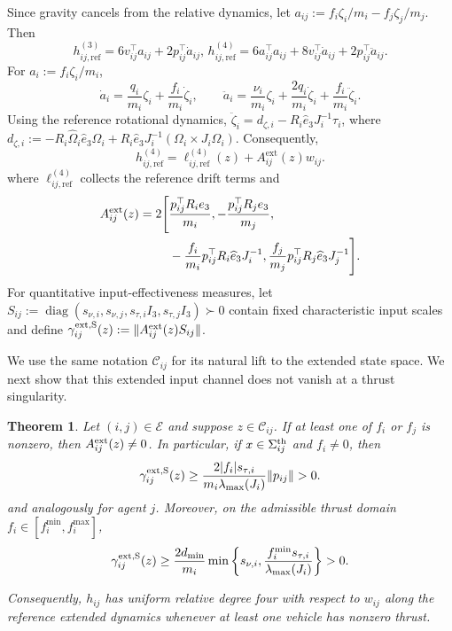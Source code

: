 \documentclass[journal,twoside,web]{ieeecolor}
\newtheorem{theorem}{Theorem}[section]
\begin{document}
Since gravity cancels from the relative dynamics, let
$a_{ij}:=f_i\zeta_i/m_i-f_j\zeta_j/m_j$. Then
\[
h_{ij,\mathrm{ref}}^{(3)}
=6v_{ij}^\top a_{ij}+2p_{ij}^\top\dot a_{ij},
\,
h_{ij,\mathrm{ref}}^{(4)}
=6a_{ij}^\top a_{ij}
+8v_{ij}^\top\dot a_{ij}
+2p_{ij}^\top\ddot a_{ij}.
\]
For $a_i:=f_i\zeta_i/m_i$,
\[
\dot a_i
=\frac{q_i}{m_i}\zeta_i+\frac{f_i}{m_i}\dot\zeta_i,
\qquad
\ddot a_i
=\frac{\nu_i}{m_i}\zeta_i
+\frac{2q_i}{m_i}\dot\zeta_i
+\frac{f_i}{m_i}\ddot\zeta_i.
\]
Using the reference rotational dynamics,
$\ddot\zeta_i=d_{\zeta,i}
-R_i\widehat e_3J_i^{-1}\tau_i$, where
$d_{\zeta,i}:=
-R_i\widehat\Omega_i\widehat e_3\Omega_i
+R_i\widehat e_3J_i^{-1}
(\Omega_i\times J_i\Omega_i)$. Consequently,
\begin{equation}
    h_{ij,\mathrm{ref}}^{(4)}
    =
    \ell_{ij,\mathrm{ref}}^{(4)}(z)
    +
    A_{ij}^{\mathrm{ext}}(z)w_{ij}.
    \label{eq:h4_affine}
\end{equation}
where $\ell_{ij,\mathrm{ref}}^{(4)}$ collects the reference drift terms and
\begin{equation}
\begin{aligned}
A_{ij}^{\rm ext}(z)
=
2\Bigg[
&\frac{p_{ij}^{\top}R_ie_3}{m_i},
-\frac{p_{ij}^{\top}R_je_3}{m_j},\\
&-\frac{f_i}{m_i}
 p_{ij}^{\top}R_i\widehat e_3J_i^{-1},
\frac{f_j}{m_j}
 p_{ij}^{\top}R_j\widehat e_3J_j^{-1}
\Bigg].
\end{aligned}
\label{eq:Aext}
\end{equation}
For quantitative input-effectiveness measures, let
$S_{ij}:=\operatorname{diag}
(s_{\nu,i},s_{\nu,j},s_{\tau,i}I_3,s_{\tau,j}I_3)\succ0$
contain fixed characteristic input scales and define
$\gamma_{ij}^{\rm ext,S}(z):=
\|A_{ij}^{\rm ext}(z)S_{ij}\|$.

 We use the same notation $\mathcal C_{ij}$ for its natural lift to the extended state space. We next show that this
extended input channel does not vanish at a thrust singularity.



\begin{theorem}
\label{thm:singularity_removal}
Let $(i,j)\in\mathcal E$ and suppose
$z\in\mathcal C_{ij}$. If at least one of $f_i$ or $f_j$
is nonzero, then $A_{ij}^{\rm ext}(z)\neq0$. In particular,
if $x\in\Sigma_{ij}^{\rm th}$ and $f_i\neq0$, then
\begin{equation}
    \gamma_{ij}^{\rm ext,S}(z)
\ge
\frac{2|f_i|s_{\tau,i}}
{m_i\lambda_{\max}(J_i)}
\|p_{ij}\|>0.
    \label{eq:gamma_ext_bound}
\end{equation}
and analogously for agent $j$. Moreover, on the admissible
thrust domain $f_i\in[f_i^{\min},f_i^{\max}]$,
\begin{equation}
\gamma_{ij}^{\rm ext,S}(z)
\ge
\frac{2d_{\min}}{m_i}
\min\left\{
s_{\nu,i},
\frac{f_i^{\min}s_{\tau,i}}
{\lambda_{\max}(J_i)}
\right\}
>0.
\label{eq:gamma_ext_uniform_bound}
\end{equation}

Consequently,
$h_{ij}$ has uniform relative degree four
with respect to $w_{ij}$ along the reference extended dynamics
whenever at least one vehicle has nonzero thrust.
\end{theorem}
\end{document}
